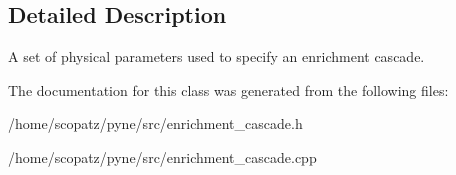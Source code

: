 \subsection{Detailed Description}
A set of physical parameters used to specify an enrichment cascade. 

The documentation for this class was generated from the following files\-:\begin{DoxyCompactItemize}
\item 
/home/scopatz/pyne/src/enrichment\-\_\-cascade.\-h\item 
/home/scopatz/pyne/src/enrichment\-\_\-cascade.\-cpp\end{DoxyCompactItemize}

